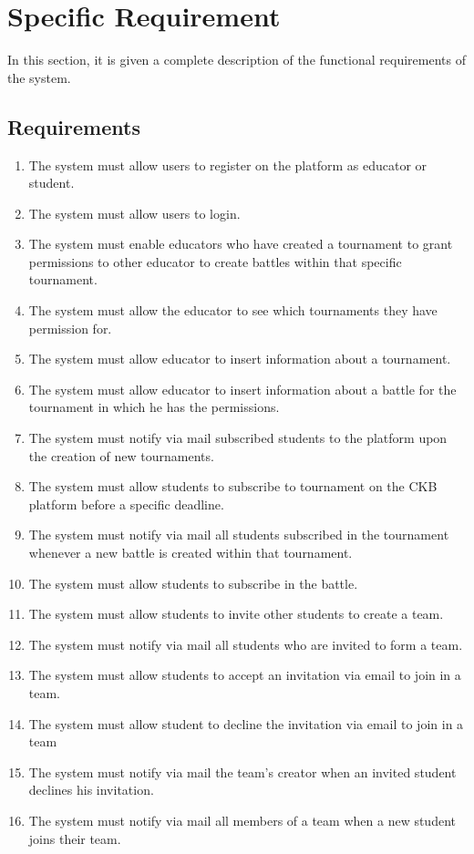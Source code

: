 \section{Specific Requirement}
In this section, it is given a complete description of the functional requirements of the system.
\subsection{Requirements}
\begin{enumerate}[label=\bfseries R\arabic*]
    \item The system must allow  users to register on the platform as educator or student.
    \item The system must allow  users to login.
    \item  The system must enable educators who have created a tournament to grant permissions to other educator  to create battles within that specific tournament.

    
    \item The system must allow the educator to see which tournaments they have permission for.
    \item The system must allow educator to insert information about a tournament.
    \item The system must allow educator to insert information about a battle for the tournament in which he has the permissions.
    
    \item The system must notify via mail subscribed students to the platform upon the creation of new tournaments.
    \item  The system must allow students to subscribe to tournament on the CKB platform before a specific deadline.
    \item  The system must notify via mail  all students subscribed in the tournament whenever a new battle is created within that tournament.

    \item The system must allow students to subscribe in the battle.

    \item The system must allow students to invite other students to create a team.
    
    \item The system must notify via mail all students who are invited to form a team.
    \item The system must allow students to accept an invitation via email to join in a team.
    \item The system must allow student to decline the invitation via email to join in a team
    \item The system must notify via mail the team's creator when an invited student declines his invitation.
    \item The system must notify via mail all members of a team when a new student joins their team.


\end{enumerate}
